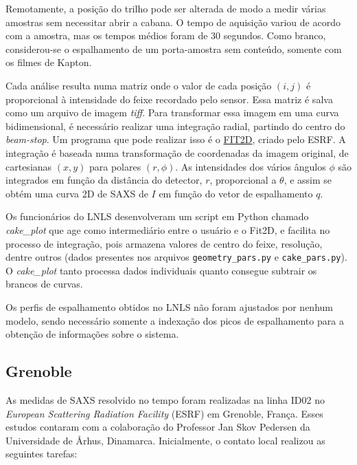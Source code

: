 			Remotamente, a posição do trilho pode ser alterada de modo a medir várias amostras sem necessitar abrir a cabana. O tempo de aquisição variou de acordo com a amostra, mas os tempos médios foram de 30 segundos. Como branco, considerou-se o espalhamento de um porta-amostra sem conteúdo, somente com os filmes de Kapton.
			
			Cada análise resulta numa matriz onde o valor de cada posição $(i, j)$ é proporcional à intensidade do feixe recordado pelo sensor. Essa matriz é salva como um arquivo de imagem \emph{tiff}. Para transformar essa imagem em uma curva bidimensional, é necessário realizar uma integração radial, partindo do centro do \emph{beam-stop}. Um programa que pode realizar isso é o \href{http://www.esrf.eu/computing/scientific/FIT2D/windows.html}{FIT2D}, criado pelo ESRF. A integração é baseada numa transformação de coordenadas da imagem original, de cartesianas $(x, y)$ para polares $(r, \phi)$. As intensidades dos vários ângulos $\phi$ são integrados em função da distância do detector, $r$, proporcional a $\theta$, e assim se obtém uma curva 2D de SAXS de $I$ em função do vetor de espalhamento $q$. 
			
			Os funcionários do LNLS desenvolveram um script em Python chamado \emph{cake\_plot} que age como intermediário entre o usuário e o Fit2D, e facilita no processo de integração, pois armazena valores de centro do feixe, resolução, dentre outros (dados presentes nos arquivos \texttt{geometry\_pars.py} e \texttt{cake\_pars.py}). O \emph{cake\_plot} tanto processa dados individuais quanto consegue subtrair os brancos de curvas.
			
			Os perfis de espalhamento obtidos no LNLS não foram ajustados por nenhum modelo, sendo necessário somente a indexação dos picos de espalhamento para a obtenção de informações sobre o sistema.		
			
			\subsection{Grenoble}
			As medidas de SAXS resolvido no tempo foram realizadas na linha ID02 no \emph{European Scattering Radiation Facility} (ESRF) em Grenoble, França. Esses estudos contaram com a colaboração do Professor Jan Skov Pedersen da Universidade de \AA rhus, Dinamarca. Inicialmente, o contato local realizou as seguintes tarefas:
			
